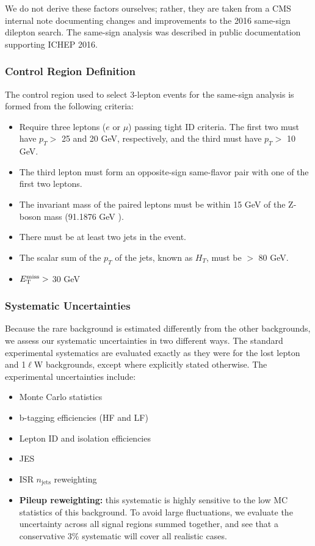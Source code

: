 We do not derive these factors ourselves; rather, they are taken
from a CMS internal note documenting changes and improvements to the
2016 same-sign dilepton search. The same-sign analysis was described
in public documentation supporting ICHEP 2016\cite{samesign}.

\subsubsection{Control Region Definition}
\label{sssec:stop:rarebkg:crdefinitions}

The control region used to select 3-lepton events for the same-sign
analysis is formed from the following criteria:
\begin{itemize}
\item Require three leptons ($e$ or $\mu$) passing tight ID
  criteria. The first two must have $p_T >$ 25 and 20 GeV,
  respectively, and the third must have $p_T >$ 10 GeV.
\item The third lepton must form an opposite-sign same-flavor pair
  with one of the first two leptons.
\item The invariant mass of the paired leptons must be within 15 GeV
  of the Z-boson mass (91.1876 GeV \cite{pdg}).
\item There must be at least two jets in the event.
\item The scalar sum of the $p_T$ of the jets, known as $H_T$, must
  be $>$ 80 GeV.
\item $E_\text{T}^\text{miss} >$ 30 GeV
\end{itemize}

\subsubsection{Systematic Uncertainties}
\label{sssec:stop:rarebkg:systematics}

Because the rare background is estimated differently from the other
backgrounds, we assess our systematic uncertainties in two different
ways. The standard experimental systematics are evaluated exactly as
they were for the lost lepton and 1$\ell$W backgrounds, except where
explicitly stated otherwise. The experimental uncertainties include:
\begin{itemize}
\item Monte Carlo statistics
\item b-tagging efficiencies (HF and LF)
\item Lepton ID and isolation efficiencies
\item JES
\item ISR $n_\text{jets}$ reweighting
\item \textbf{Pileup reweighting:} this systematic is highly sensitive to the
  low MC statistics of this background. To avoid large fluctuations,
  we evaluate the uncertainty across all signal regions summed
  together, and see that a conservative 3\% systematic will cover all
  realistic cases.
\end{itemize}

